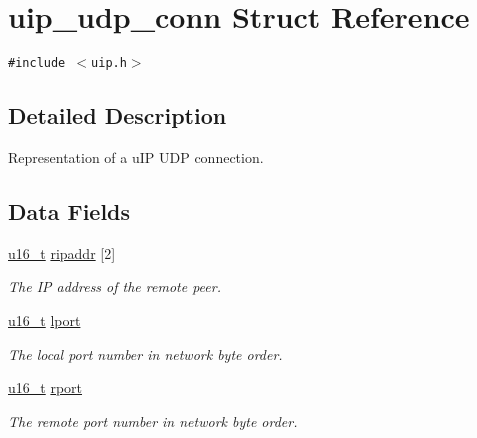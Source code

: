 \hypertarget{a00032}{
\section{uip\_\-udp\_\-conn Struct Reference}
\label{a00032}
}
{\tt \#include $<$uip.h$>$}



\subsection{Detailed Description}
Representation of a u\-IP UDP connection. 

\subsection*{Data Fields}
\begin{CompactItemize}
\item 
\hypertarget{a00032_8a8e7206b58cccafa20d378a7747db0b}{
\hyperlink{a00070_gfc6499c1f28697aa3bfc2804d496fd11}{u16\_\-t} \hyperlink{a00032_8a8e7206b58cccafa20d378a7747db0b}{ripaddr} \mbox{[}2\mbox{]}}
\label{a00032_8a8e7206b58cccafa20d378a7747db0b}

\begin{CompactList}\small\item\em The IP address of the remote peer. \item\end{CompactList}\item 
\hypertarget{a00032_981392e295db4d024eea95805c51c371}{
\hyperlink{a00070_gfc6499c1f28697aa3bfc2804d496fd11}{u16\_\-t} \hyperlink{a00032_981392e295db4d024eea95805c51c371}{lport}}
\label{a00032_981392e295db4d024eea95805c51c371}

\begin{CompactList}\small\item\em The local port number in network byte order. \item\end{CompactList}\item 
\hypertarget{a00032_280a0c2a93544e597f92bbacf36ee1dc}{
\hyperlink{a00070_gfc6499c1f28697aa3bfc2804d496fd11}{u16\_\-t} \hyperlink{a00032_280a0c2a93544e597f92bbacf36ee1dc}{rport}}
\label{a00032_280a0c2a93544e597f92bbacf36ee1dc}

\begin{CompactList}\small\item\em The remote port number in network byte order. \item\end{CompactList}\end{CompactItemize}
